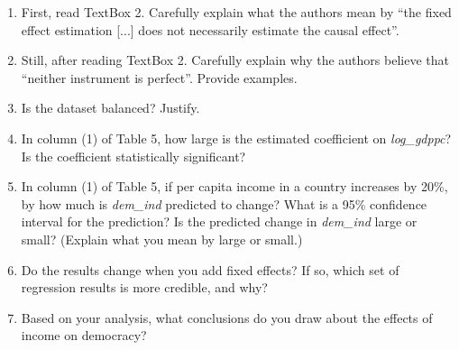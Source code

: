 \documentclass{article}
\begin{document}
\begin{enumerate}[label=\alph*)]

\item First, read TextBox 2. Carefully explain what the authors mean by ``the fixed effect estimation [...] does not necessarily estimate the causal effect''. 
\item Still, after reading TextBox 2. Carefully explain why the authors believe that ``neither instrument is perfect''. Provide examples. 
\item Is the dataset balanced? Justify.
\item In column (1) of Table 5, how large is the estimated coefficient on \textit{log\_gdppc}? Is the coefficient statistically significant?
\item In column (1) of Table 5, if per capita income in a country increases by 20\%, by how much is \textit{dem\_ind} predicted to change? What is a 95\% confidence interval for the prediction? Is the predicted change in \textit{dem\_ind} large or small? (Explain what you mean by large or small.)
\item Do the results change when you add fixed effects? If so, which set of regression results is more credible, and why? 
\item Based on your analysis, what conclusions do you draw about the effects of income on democracy?
\end{enumerate}

\newpage
\end{document}
